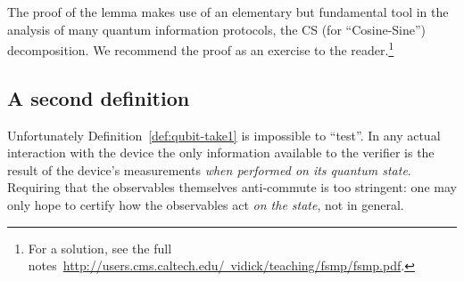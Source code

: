 The proof of the lemma makes use of an elementary but fundamental tool in the analysis of many quantum information protocols, the CS (for ``Cosine-Sine'') decomposition. We recommend the proof as an exercise to the reader.\footnote{For a solution, see the full notes~\href{http://users.cms.caltech.edu/\~{}vidick/teaching/fsmp/fsmp.pdf}{http://users.cms.caltech.edu/~vidick/teaching/fsmp/fsmp.pdf}.}

\subsection{A second definition}

Unfortunately Definition~\ref{def:qubit-take1} is impossible to ``test''. In any actual interaction with the device the only information available to the verifier is the result of the device's measurements \emph{when performed on its quantum state}. Requiring that the observables themselves anti-commute is too stringent: one may only hope to certify how the observables act \emph{on the state}, not in general. 

